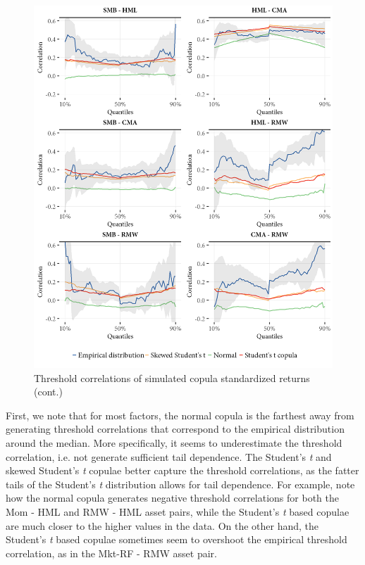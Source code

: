 \begin{figure}[!ht]
  \ContinuedFloat
  \centering

  \includegraphics[scale=1]{graphics/threshold_simulated_2.png}  

  \caption{Threshold correlations of simulated copula standardized returns (cont.)}
\end{figure}

First, we note that for most factors, the normal copula is the farthest away from generating threshold correlations that correspond to the empirical distribution around the median. More specifically, it seems to underestimate the threshold correlation, i.e. not generate sufficient tail dependence. The Student's \textit{t} and skewed Student's \textit{t} copulae better capture the threshold correlations, as the fatter tails of the Student's \textit{t} distribution allows for tail dependence. For example, note how the normal copula generates negative threshold correlations for both the Mom - HML and RMW - HML asset pairs, while the Student's \textit{t} based copulae are much closer to the higher values in the data. On the other hand, the Student's \textit{t} based copulae sometimes seem to overshoot the empirical threshold correlation, as in the Mkt-RF - RMW asset pair.

